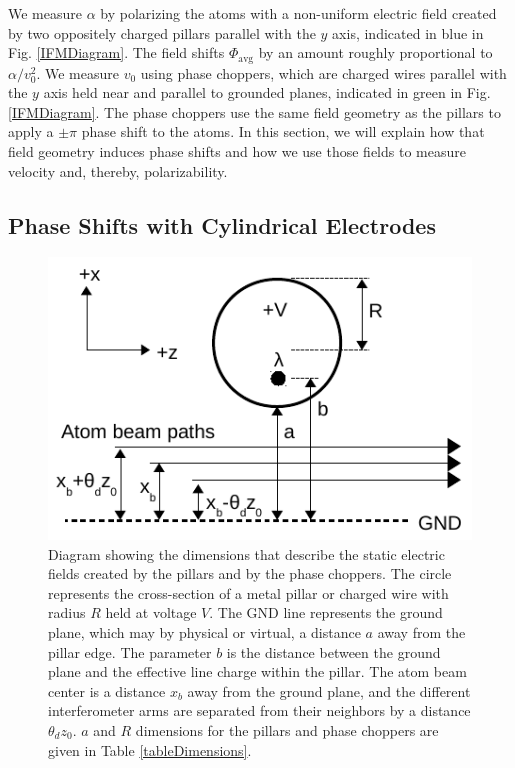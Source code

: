 \documentclass[twocolumn,prl,showpacs,superscriptaddress]{revtex4-1}   %
\newcommand{\figref}[1]{Fig. \ref{#1}}
\begin{document}
We measure $\alpha$ by polarizing the atoms with a non-uniform electric field created by two oppositely charged pillars parallel with the $y$ axis, indicated in blue in \figref{IFMDiagram}. The field shifts $\Phi_{\mathrm{avg}}$ by an amount roughly proportional to $\alpha/v_0^2$. We measure $v_0$ using phase choppers, which are charged wires parallel with the $y$ axis held near and parallel to grounded planes, indicated in green in \figref{IFMDiagram}. The phase choppers use the same field geometry as the pillars to apply a $\pm\pi$ phase shift to the atoms. In this section, we will explain how that field geometry induces phase shifts and how we use those fields to measure velocity and, thereby, polarizability. 

\subsection{Phase Shifts with Cylindrical Electrodes}

\begin{figure}
\includegraphics[width=\linewidth,keepaspectratio]{EDiagram1.pdf}
\caption{\label{EDiagram}Diagram showing the dimensions that describe the static electric fields created by the pillars and by the phase choppers. The circle represents the cross-section of a metal pillar or charged wire with radius $R$ held at voltage $V$. The GND line represents the ground plane, which may by physical or virtual, a distance $a$ away from the pillar edge. The parameter $b$ is the distance between the ground plane and the effective line charge within the pillar. The atom beam center is a distance $x_b$ away from the ground plane, and the different interferometer arms are separated from their neighbors by a distance $\theta_d z_0$. $a$ and $R$ dimensions for the pillars and phase choppers are given in Table \ref{tableDimensions}.}
\end{figure}
\end{document}
